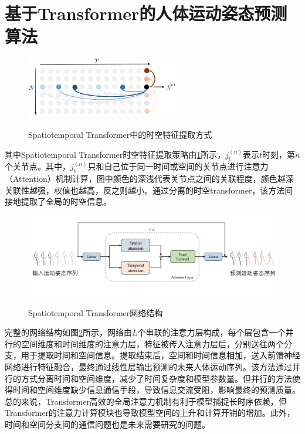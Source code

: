 \section{基于Transformer的人体运动姿态预测算法}
\begin{figure}[ht]
    \centering
    \includegraphics[width=0.6\textwidth]{FigMa/ST-Transformer.png}\\
    \vspace{-0.3cm}
    \caption{Spatiotemporal Transformer\parencite{aksan2021spatio}中的时空特征提取方式}
    \label{fig:Spatial-temporal_Transformer}
\end{figure}
其中Spatiotemporal Transformer时空特征提取策略由\ref{fig:Spatial-temporal_Transformer}所示，$j^{(n)}_t$表示$t$时刻，第$n$个关节点。其中，$j^{(n)}_t$只和自己位于同一时间或空间的关节点进行注意力（Attention）机制计算，图中颜色的深浅代表关节点之间的关联程度，颜色越深关联性越强，权值也越高，反之则越小。通过分离的时空transformer，该方法间接地提取了全局的时空信息。

\begin{figure}[h]
    \centering
    \includegraphics[width=1\textwidth]{FigMa/ST_Transformer.png}\\
    \vspace{-0.3cm}
    \caption{Spatiotemporal Transformer\parencite{aksan2021spatio}网络结构}
    \label{fig:Spatial-temporal_Transformer_structure}
\end{figure}
完整的网络结构如图\ref{fig:Spatial-temporal_Transformer_structure}所示，网络由$L$个串联的注意力层构成，每个层包含一个并行的空间维度和时间维度的注意力层，特征被传入注意力层后，分别送往两个分支，用于提取时间和空间信息。提取结束后，空间和时间信息相加，送入前馈神经网络进行特征融合，最终通过线性层输出预测的未来人体运动序列。该方法通过并行的方式分离时间和空间维度，减少了时间复杂度和模型参数量。但并行的方法使得时间和空间维度缺少信息通信手段，导致信息交流受阻，影响最终的预测质量。总的来说，Transformer高效的全局注意力机制有利于模型捕捉长时序依赖，但Transformer的注意力计算模块也导致模型空间的上升和计算开销的增加。此外，时间和空间分支间的通信问题也是未来需要研究的问题。

